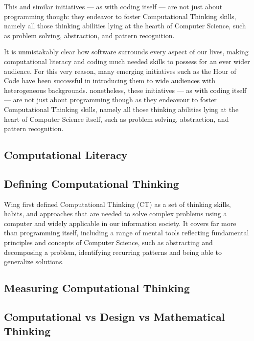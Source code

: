 This and similar initiatives --- as with coding itself --- are not just about programming though: they endeavor to foster Computational Thinking skills, namely all those thinking abilities lying at the hearth of Computer Science, such as problem solving, abstraction, and pattern recognition.

It is unmistakably clear how software surrounds every aspect of our lives, making computational literacy and coding much needed skills to possess for an ever wider audience. For this very reason, many emerging initiatives such as the Hour of Code have been successful in introducing them to wide audiences with heterogeneous backgrounds. nonetheless, these initiatives --- as with coding itself --- are not just about programming though as they endeavour to foster Computational Thinking skills, namely all those thinking abilities lying at the heart of Computer Science itself, such as problem solving, abstraction, and pattern recognition.

\subsection{Computational Literacy} %

\subsection{Defining Computational Thinking} %
Wing first defined Computational Thinking (CT) as a set of thinking skills, habits, and approaches that are needed to solve complex problems using a computer and widely applicable in our information society. It covers far more than programming itself, including a range of mental tools reflecting fundamental principles and concepts of Computer Science, such as abstracting and decomposing a problem, identifying recurring patterns and being able to generalize solutions.

\subsection{Measuring Computational Thinking} %

\subsection{Computational vs Design vs Mathematical Thinking} %

